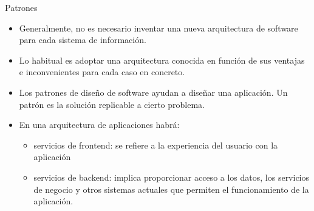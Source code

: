 \documentclass[12pt, twoside, openright]{report} %
\begin{document}
Patrones
\begin{itemize}
	\item Generalmente, no es necesario inventar una
nueva arquitectura de software para cada
sistema de información.
	\item Lo habitual es adoptar una arquitectura
conocida en función de sus ventajas e
inconvenientes para cada caso en concreto.
	\item Los patrones de diseño de software ayudan
a diseñar una aplicación. Un patrón es la
solución replicable a cierto problema.
	\item En una arquitectura de aplicaciones habrá:
	\begin{itemize}
		\item servicios de frontend: se refiere a la
experiencia del usuario con la aplicación
		\item servicios de backend: implica
proporcionar acceso a los datos, los
servicios de negocio y otros sistemas
actuales que permiten el funcionamiento
de la aplicación.
	\end{itemize}

\end{itemize}
\end{document}

